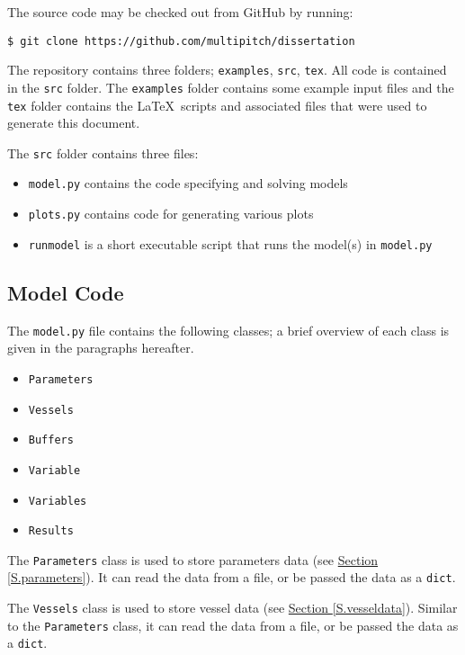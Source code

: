 The source code may be checked out from GitHub by running:

\texttt{\$ git clone https://github.com/multipitch/dissertation}

The repository contains three folders; \texttt{examples}, \texttt{src},
\texttt{tex}.
All code is contained in the \texttt{src} folder.  The \texttt{examples} folder
contains some example input files and the \texttt{tex} folder contains the
\LaTeX\ scripts and associated files that were used to generate this document.

The \texttt{src} folder contains three files:
\begin{itemize}
    \item \texttt{model.py} contains the code specifying and solving models
    \item \texttt{plots.py} contains code for generating various plots
    \item \texttt{runmodel} is a short executable script that runs the model(s)
        in \texttt{model.py}
\end{itemize}

\subsection{Model Code}\label{SS.modelcode}

The \texttt{model.py} file contains the following classes; a brief overview of
each class is given in the paragraphs hereafter.
\begin{itemize}
    \item \texttt{Parameters}
    \item \texttt{Vessels}
    \item \texttt{Buffers}
    \item \texttt{Variable}
    \item \texttt{Variables}
    \item \texttt{Results}
\end{itemize}

The \texttt{Parameters} class is used to store parameters data (see 
\hyperref[S.parameters]{Section \ref*{S.parameters}}). 
It can read the data from a file, or be passed the data as a \texttt{dict}.

The \texttt{Vessels} class is used to store vessel data (see 
\hyperref[S.vesseldata]{Section \ref*{S.vesseldata}}).
Similar to the \texttt{Parameters} class, it can read the data from a file, or
be passed the data as a \texttt{dict}.

